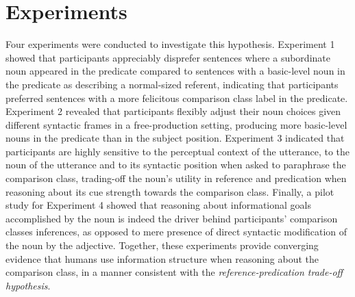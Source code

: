 \section{Experiments}
Four experiments were conducted to investigate this hypothesis. Experiment 1 showed that participants appreciably disprefer sentences where a subordinate noun appeared in the predicate compared to sentences with a basic-level noun in the predicate as describing a normal-sized referent, indicating that participants preferred sentences with a more felicitous comparison class label in the predicate. Experiment 2 revealed that participants flexibly adjust their noun choices given different syntactic frames in a free-production setting, producing more basic-level nouns in the predicate than in the subject position. Experiment 3 indicated that participants are highly sensitive to the perceptual context of the utterance, to the noun of the utterance and to its syntactic position when asked to paraphrase the comparison class, trading-off the noun's utility in reference and predication when reasoning about its cue strength towards the comparison class. Finally, a pilot study for Experiment 4 showed that reasoning about informational goals accomplished by the noun is indeed the driver behind participants' comparison classes inferences, as opposed to mere presence of direct syntactic modification of the noun by the adjective. %
Together, these experiments provide converging evidence that humans use information structure when reasoning about the comparison class, in a manner consistent with the \emph{reference-predication trade-off hypothesis}. 

